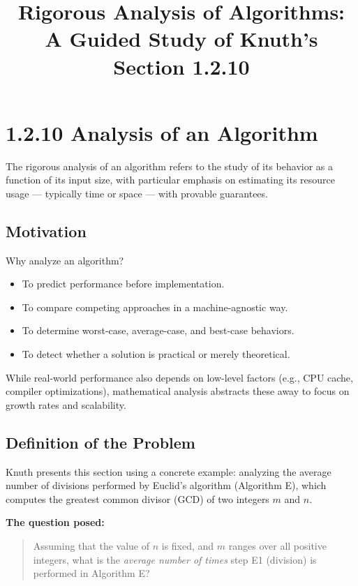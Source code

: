 \documentclass{article}
\title{Rigorous Analysis of Algorithms:\\A Guided Study of Knuth's Section 1.2.10}
\author{}
\date{}
\begin{document}
\maketitle

\section*{1.2.10 Analysis of an Algorithm}

The rigorous analysis of an algorithm refers to the study of its behavior as a function of its input size, with particular emphasis on estimating its resource usage — typically time or space — with provable guarantees.

\subsection*{Motivation}

Why analyze an algorithm?

\begin{itemize}
    \item To predict performance before implementation.
    \item To compare competing approaches in a machine-agnostic way.
    \item To determine worst-case, average-case, and best-case behaviors.
    \item To detect whether a solution is practical or merely theoretical.
\end{itemize}

While real-world performance also depends on low-level factors (e.g., CPU cache, compiler optimizations), mathematical analysis abstracts these away to focus on growth rates and scalability.

\subsection*{Definition of the Problem}

Knuth presents this section using a concrete example: analyzing the average number of divisions performed by Euclid's algorithm (Algorithm E), which computes the greatest common divisor (GCD) of two integers $m$ and $n$.

\vspace{1em}
\noindent\textbf{The question posed:}

\begin{quote}
Assuming that the value of $n$ is fixed, and $m$ ranges over all positive integers, what is the \textit{average number of times} step E1 (division) is performed in Algorithm E?
\end{quote}
\end{document}
